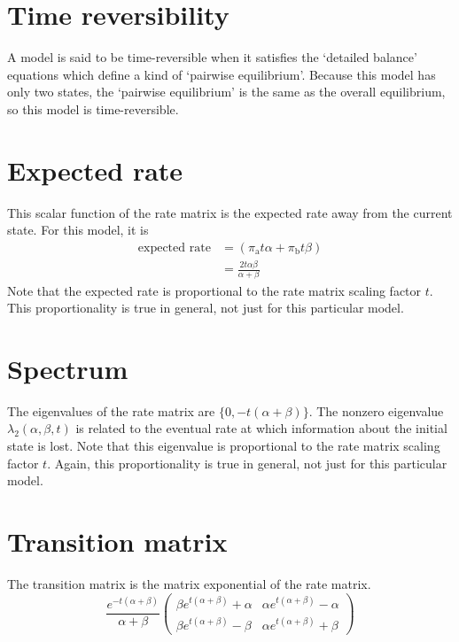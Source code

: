 \documentclass{article}
\providecommand{\Ao}{\text{a}}
\providecommand{\Bo}{\text{b}}
\providecommand{\Pa}{\alpha}
\providecommand{\Pb}{\beta}
\begin{document}
\section{Time reversibility}

A model is said to be time-reversible when it satisfies the
`detailed balance' equations which define a kind of `pairwise equilibrium'.
Because this model has only two states, the `pairwise equilibrium'
is the same as the overall equilibrium, so this model is time-reversible.

\section{Expected rate}

This scalar function of the rate matrix is the expected rate
away from the current state.
For this model, it is
\begin{align}
\text{expected rate}
&=
\left( \pi_\Ao t \Pa + \pi_\Bo t \Pb \right) \\
&=
\frac{2 t \Pa \Pb}{\Pa + \Pb}
\end{align}
Note that the expected rate is proportional to the rate matrix scaling
factor $t$.
This proportionality is true in general, not just for this particular model.

\section{Spectrum}

The eigenvalues of the rate matrix are
$\{ 0, - t \left( \Pa + \Pb \right) \}$.
The nonzero eigenvalue
$\lambda_2 \left( \Pa, \Pb, t \right)$
is related to the eventual rate
at which information about the initial state is lost.
Note that this eigenvalue is proportional to the rate matrix scaling
factor $t$.
Again, this proportionality is true in general,
not just for this particular model.

\section{Transition matrix}

The transition matrix is the matrix exponential of the rate matrix.
\begin{equation}
	\frac{e^{- t \left( \Pa + \Pb \right)}}{\Pa + \Pb}
	\begin{pmatrix}
		\Pb e^{t \left( \Pa + \Pb \right) } + \Pa &
		\Pa e^{t \left( \Pa + \Pb \right) } - \Pa \\
		\Pb e^{t \left( \Pa + \Pb \right) } - \Pb &
		\Pa e^{t \left( \Pa + \Pb \right) } + \Pb
	\end{pmatrix}
\end{equation}
\end{document}
